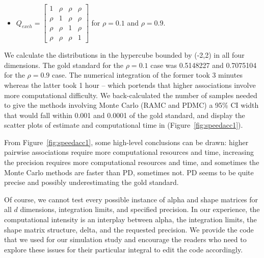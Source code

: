 

\begin{itemize}
\item $Q_{exch}= \begin{bmatrix}
       1 & \rho & \rho  & \rho \\
    \rho &    1 & \rho  & \rho  \\
    \rho & \rho &    1  & \rho \\
    \rho & \rho & \rho  &    1
\end{bmatrix}$  for $\rho = 0.1$ and $\rho=0.9$.

\end{itemize}


We calculate the distributions in the hypercube bounded by (-2,2) in
all four dimensions.  The gold standard for the $\rho=0.1$ case was
0.5148227 and 0.7075104 for the $\rho=0.9$ case. The numerical
integration of the former took 3 minutes whereas the latter took 1
hour -- which portends that higher associations involve more
computational difficulty.  We back-calculated the number of
samples needed to give the methods involving Monte Carlo (RAMC and
PDMC) a 95\% CI
width that would fall within 0.001 and 0.0001 of the gold standard,
and display the scatter plots of estimate and computational time in
(Figure~\ref{fig:speedacc1}).

From Figure~\ref{fig:speedacc1}, some high-level conclusions can be
drawn: higher pairwise associations require more computational
resources and time, increasing the precision requires more
computational resources and time, and sometimes the Monte Carlo
methods are faster than PD, sometimes not.  PD seems to be quite
precise and possibly underestimating the gold standard.

Of course, we cannot test every possible instance of alpha and shape
matrices for all $d$ dimensions, integration limits, and specified
precision.  In our experience, the computational intensity is an
interplay between alpha, the integration limits, the shape matrix
structure, delta, and the requested precision.  We provide the code
that we used for our simulation study and encourage the readers who
need to explore these issues for their particular integral to edit the
code accordingly.



